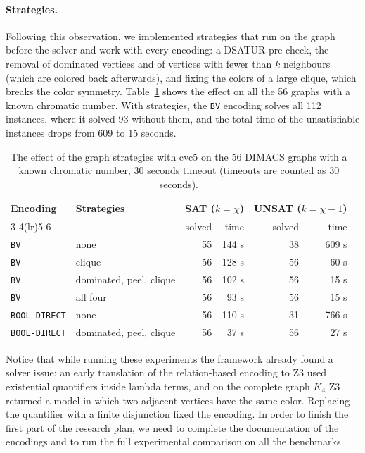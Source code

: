 \documentclass[12pt,a4paper]{article}
\newcommand{\enc}[1]{\texttt{#1}}
\theoremstyle{definition}
\begin{document}
\paragraph{Strategies.}
Following this observation, we implemented strategies that run on the graph before
the solver and work with every encoding: a DSATUR pre-check, the removal of
dominated vertices and of vertices with fewer than $k$ neighbours (which are
colored back afterwards), and fixing the colors of a large clique, which breaks the
color symmetry. Table~\ref{tab:strategies} shows the effect on all the 56 graphs
with a known chromatic number. With strategies, the \enc{BV} encoding solves all 112
instances, where it solved 93 without them, and the total time of the
unsatisfiable instances drops from 609 to 15 seconds.

\begin{table}[t]
  \centering
  \small
  \begin{tabular}{@{}llrrrr@{}}
    \toprule
    Encoding & Strategies & \multicolumn{2}{c}{SAT ($k = \chi$)} &
      \multicolumn{2}{c}{UNSAT ($k = \chi - 1$)} \\
    \cmidrule(lr){3-4}\cmidrule(lr){5-6}
     & & solved & time & solved & time \\
    \midrule
    \enc{BV}          & none                          & 55 & 144 s & 38 & 609 s \\
    \enc{BV}          & clique                        & 56 & 128 s & 56 &  60 s \\
    \enc{BV}          & dominated, peel, clique       & 56 & 102 s & 56 &  15 s \\
    \enc{BV}          & all four                      & 56 &  93 s & 56 &  15 s \\
    \enc{BOOL-DIRECT} & none                          & 56 & 110 s & 31 & 766 s \\
    \enc{BOOL-DIRECT} & dominated, peel, clique       & 56 &  37 s & 56 &  27 s \\
    \bottomrule
  \end{tabular}
  \caption{The effect of the graph strategies with cvc5 on the 56 DIMACS graphs with a
  known chromatic number, 30 seconds timeout (timeouts are counted as 30 seconds).}
  \label{tab:strategies}
\end{table}

Notice that while running these experiments the framework already found a
solver issue: an early translation of the relation-based encoding to Z3 used
existential quantifiers inside lambda terms, and on the complete graph $K_4$ Z3
returned a model in which two adjacent vertices have the same color. Replacing the
quantifier with a finite disjunction fixed the encoding. In order to finish the
first part of the research plan, we need to complete the documentation of the
encodings and to run the full experimental comparison on all the benchmarks.



\end{document}
